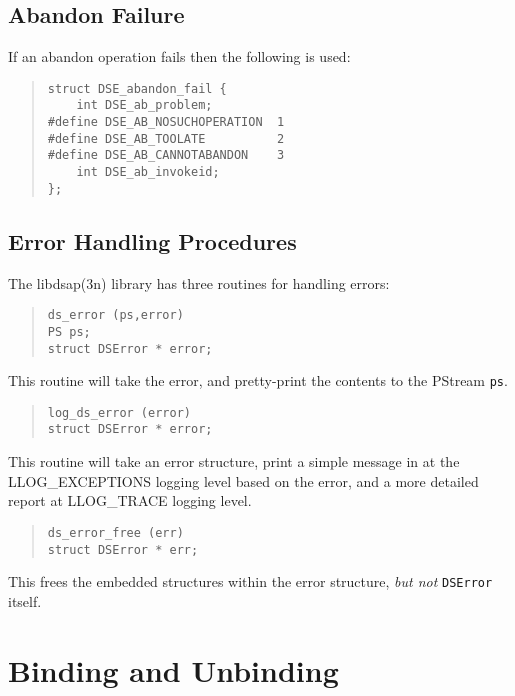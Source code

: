 \subsection{Abandon Failure}
If an abandon operation fails then the following is used:
\begin{quote}\small\begin{verbatim}
struct DSE_abandon_fail {
    int DSE_ab_problem;
#define DSE_AB_NOSUCHOPERATION  1
#define DSE_AB_TOOLATE          2
#define DSE_AB_CANNOTABANDON    3
    int DSE_ab_invokeid;
};
\end{verbatim}\end{quote}

\subsection {Error Handling Procedures}

The \man libdsap(3n) library has three routines for handling errors:

\begin{quote}\small\begin{verbatim}
ds_error (ps,error)
PS ps;
struct DSError * error;
\end{verbatim}\end{quote}

This routine will take the error, and pretty-print the contents to the
PStream \verb"ps".

\begin{quote}\small\begin{verbatim}
log_ds_error (error)
struct DSError * error;
\end{verbatim}\end{quote}

This routine will take an error structure, print a simple message
in  at 
the LLOG\_EXCEPTIONS logging level based on the error, and a more detailed
report at LLOG\_TRACE logging level.

\begin{quote}\small\begin{verbatim}
ds_error_free (err)
struct DSError * err;
\end{verbatim}\end{quote}

This frees the embedded structures within the error structure,
{\em but not} \verb"DSError" itself.

\section {Binding and Unbinding}
\label{dap:bind}

